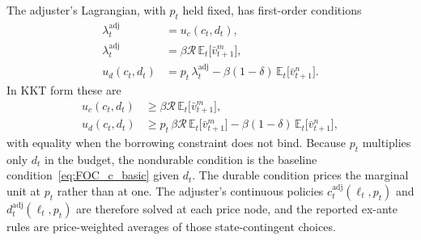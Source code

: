 The adjuster's Lagrangian, with $p_t$ held fixed, has first-order conditions
\begin{align}
	\lambda_t^{\mathrm{adj}} &= u_c(c_t,d_t), \label{eq:price_foc_c}\\
	\lambda_t^{\mathrm{adj}} &= \beta \mathcal{R}\, \mathbb{E}_t\big[\bar v_{t+1}^m\big], \label{eq:price_foc_a}\\
	u_d(c_t,d_t) &= p_t\,\lambda_t^{\mathrm{adj}} - \beta(1-\delta)\,\mathbb{E}_t\big[\bar v_{t+1}^n\big]. \label{eq:price_foc_d}
\end{align}
In KKT form these are
\begin{align}
	u_c(c_t, d_t) &\geq \beta \mathcal{R}\, \mathbb{E}_t \big[\bar v_{t+1}^m\big], \\
	u_d(c_t, d_t) &\geq p_t\,\beta \mathcal{R}\, \mathbb{E}_t\big[\bar v_{t+1}^m\big] - \beta (1 - \delta)\, \mathbb{E}_t\big[\bar v_{t+1}^n\big],
\end{align}
with equality when the borrowing constraint does not bind. Because $p_t$ multiplies only $d_t$ in the budget, the nondurable condition is the baseline condition~\eqref{eq:FOC_c_basic} given $d_t$. The durable condition prices the marginal unit at $p_t$ rather than at one. The adjuster's continuous policies $c_t^{\text{adj}}(\ell_t,p_t)$ and $d_t^{\text{adj}}(\ell_t,p_t)$ are therefore solved at each price node, and the reported ex-ante rules are price-weighted averages of those state-contingent choices.

